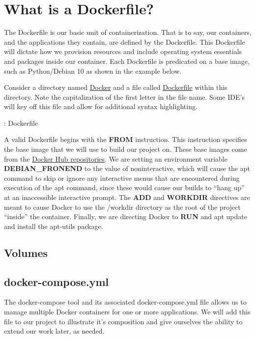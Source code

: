 \section{What is a Dockerfile?}
\justify{}
The Dockerfile is our basic unit of containerization. That is to say,
our containers, and the applications they contain, are defined by the
Dockerfile. This Dockerfile will dictate how we provision resources and
include operating system essentials and packages inside our container.
Each Dockerfile is predicated on a base image, such as Python/Debian 10
as shown in the example below.

\justify{}
Consider a directory named
\href{https://github.com/hotpeppersec/rapid_secdev_framework/tree/master/docker}{Docker}
and a file called
\href{https://github.com/hotpeppersec/rapid_secdev_framework/blob/master/docker/Dockerfile}{Dockerfile}
within this directory. Note the capitalization of the first letter in the file name. Some IDE's will key off this file and allow for additional syntax highlighting.

\justify{}
\begin{mybox}{\thetcbcounter: Dockerfile}
  
\end{mybox}

\justify{}
A valid Dockerfile begins with the \textbf{FROM} instruction. This
instruction specifies the base image that we will use to build our
project on. These base images come from the
\href{https://docs.docker.com/docker-hub/repos/}{Docker Hub
  repositories}. We are setting an environment variable
\textbf{DEBIAN\_FRONEND} to the value of noninteractive, which will
cause the apt command to skip or ignore any interactive menus that are
encountered during execution of the apt command, since these would cause
our builds to ``hang up'' at an inaccessible interactive prompt. The
\textbf{ADD} and \textbf{WORKDIR} directives are meant to cause Docker
to use the /workdir directory as the root of the project ``inside'' the
container. Finally, we are directing Docker to \textbf{RUN} and apt
update and install the apt-utils package.

\subsection{Volumes}

\subsection{docker-compose.yml}
\justify{}
The docker-compose tool and its associated docker-compose.yml file
allows us to manage multiple Docker containers for one or more
applications. We will add this file to our project to illustrate it's
composition and give ourselves the ability to extend our work later, as
needed.

